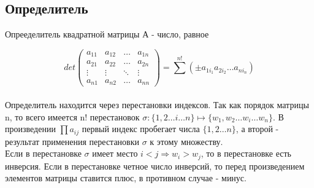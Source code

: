 \subsection{Определитель}
\begin{defin}
Опрееделитель квадратной матрицы А - число, равное
\end{defin}
\begin{equation*}
    det \left(
\begin{array}{cccc}
a_{11} & a_{12} & \ldots & a_{1n}\\
a_{21} & a_{22} & \ldots & a_{2n}\\
\vdots & \vdots & \ddots & \vdots\\
a_{n1} & a_{n2} & \ldots & a_{nn}
\end{array}
\right) = \sum \limits^{n!}(\pm a_{1i_1}a_{2i_2}\ldots a_{ni_n})
\end{equation*}\\
Определитель находится через перестановки индексов. Так как порядок матрицы n,
то всего имеется n! перестановок $\sigma \colon \{1,2 \ldots i \ldots n\} 
\mapsto \{w_1, w_2 \ldots w_i \ldots w_n\}$. В произведении $\prod a_{ij}$ 
первый индекс пробегает числа $\{1,2 \ldots n\}$, а второй - результат 
применения перестановки $\sigma$ к этому множеству.\\ Если в перестановке 
$\sigma$ имеет место $i<j\Rightarrow w_i>w_j$, то в перестановке есть инверсия.
Если в перестановке четное число инверсий, то перед произведением элементов 
матрицы ставится плюс, в противном случае - минус.

